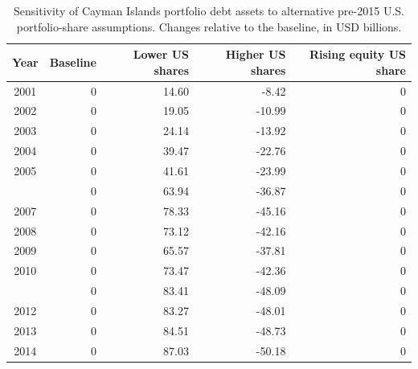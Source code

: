 \begin{table}

\caption{\label{tab:tab:sensitivity_cayman_debt}Sensitivity of Cayman Islands portfolio debt assets to alternative pre-2015 U.S. portfolio-share assumptions. Changes relative to the baseline, in USD billions.}
\centering
\begin{tabular}[t]{crrrr}
\toprule
Year & Baseline & Lower US shares & Higher US shares & Rising equity US share\\
\midrule
2001 & 0 & 14.60 & -8.42 & 0\\
2002 & 0 & 19.05 & -10.99 & 0\\
2003 & 0 & 24.14 & -13.92 & 0\\
2004 & 0 & 39.47 & -22.76 & 0\\
2005 & 0 & 41.61 & -23.99 & 0\\
\addlinespace
2006 & 0 & 63.94 & -36.87 & 0\\
2007 & 0 & 78.33 & -45.16 & 0\\
2008 & 0 & 73.12 & -42.16 & 0\\
2009 & 0 & 65.57 & -37.81 & 0\\
2010 & 0 & 73.47 & -42.36 & 0\\
\addlinespace
2011 & 0 & 83.41 & -48.09 & 0\\
2012 & 0 & 83.27 & -48.01 & 0\\
2013 & 0 & 84.51 & -48.73 & 0\\
2014 & 0 & 87.03 & -50.18 & 0\\
\bottomrule
\end{tabular}
\end{table}
